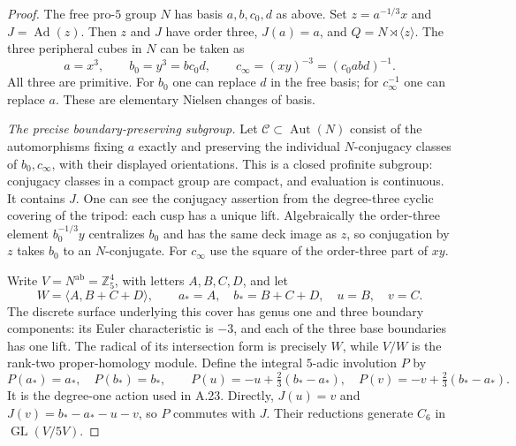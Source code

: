\begin{proof}
The free pro-$5$ group $N$ has basis $a,b,c_0,d$ as
above. Set $z=a^{-1/3}x$ and $J=\operatorname{Ad}(z)$.
Then $z$ and $J$ have order three, $J(a)=a$, and
$Q=N\rtimes\langle z\rangle$.
The three peripheral cubes in $N$ can be taken as
\[
       a=x^3,\qquad b_0=y^3=bc_0d,\qquad
       c_\infty=(xy)^{-3}=(c_0abd)^{-1}.                        \tag{A--XVII}
\]
All three are primitive. For $b_0$ one can replace $d$
in the free basis; for $c_\infty^{-1}$ one can replace
$a$. These are elementary Nielsen changes of basis.

\emph{The precise boundary-preserving subgroup.}
Let $\mathcal C\subset\operatorname{Aut}(N)$ consist
of the automorphisms fixing $a$ exactly and preserving
the individual $N$-conjugacy classes of $b_0,c_\infty$,
with their displayed orientations. This is a closed
profinite subgroup: conjugacy classes in a compact
group are compact, and evaluation is continuous.
It contains $J$. One can see the conjugacy assertion
from the degree-three cyclic covering of the tripod:
each cusp has a unique lift. Algebraically the
order-three element $b_0^{-1/3}y$ centralizes $b_0$
and has the same deck image as $z$, so conjugation
by $z$ takes $b_0$ to an $N$-conjugate. For $c_\infty$
use the square of the order-three part of $xy$.

Write $V=N^{\mathrm{ab}}=\mathbb Z_5^4$, with letters
$A,B,C,D$, and let
\[
 W=\langle A,B+C+D\rangle,\qquad
 a_*=A,\quad b_*=B+C+D,\quad u=B,\quad v=C.
\]
The discrete surface underlying this cover has genus
one and three boundary components: its Euler
characteristic is $-3$, and each of the three base
boundaries has one lift. The radical of its
intersection form is precisely $W$, while $V/W$
is the rank-two proper-homology module.
Define the integral $5$-adic involution $P$ by
\[
 P(a_*)=a_*,\quad P(b_*)=b_*,\qquad
 P(u)=-u+\tfrac23(b_*-a_*),\quad
 P(v)=-v+\tfrac23(b_*-a_*).                                   \tag{A--XVIII}
\]
It is the degree-one action used in A.23. Directly,
$J(u)=v$ and $J(v)=b_*-a_*-u-v$, so $P$ commutes
with $J$. Their reductions generate $C_6$ in
$\operatorname{GL}(V/5V)$.


\end{proof}
